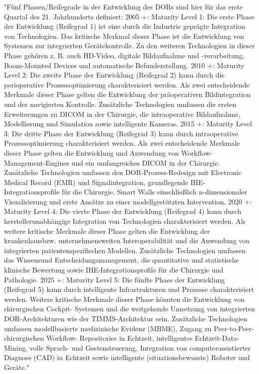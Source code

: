 	"Fünf Phasen/Reifegrade in der Entwicklung des DORs sind hier für das erste Quartal
	des 21. Jahrhunderts definiert:
		2005 +: Maturity Level 1: Die erste Phase der Entwicklung (Reifegrad 1) ist eine
	durch die Industrie geprägte Integration von Technologien. Das kritische Merkmal
	dieser Phase ist die Entwicklung von Systemen zur integrierten Gerätekontrolle. Zu
	den weiteren Technologien in dieser Phase gehören z. B. auch HD-Video, digitale Bildaufnahme
	und -verarbeitung, Boom-Mounted Devices und automatische Befunderstellung.
		2010 +: Maturity Level 2: Die zweite Phase der Entwicklung (Reifegrad 2) kann
	durch die perioperative Prozessoptimierung charakterisiert werden. Als zwei entscheidende
	Merkmale dieser Phase gelten die Entwicklung der präoperativen Bildintegration
	und der navigierten Kontrolle. Zusätzliche Technologien umfassen die
	ersten Erweiterungen zu DICOM in der Chirurgie, die intraoperative Bildaufnahme,
	Modellierung und Simulation sowie intelligente Kameras.
		2015 +: Maturity Level 3: Die dritte Phase der Entwicklung (Reifegrad 3) kann
	durch intraoperative Prozessoptimierung charakterisiert werden. Als zwei entscheidende
	Merkmale dieser Phase gelten die Entwicklung und Anwendung von Workflow-
	Management-Engines und ein umfangreiches DICOM in der Chirurgie. Zusätzliche
	Technologien umfassen den DOR-Prozess-Redesign mit Electronic Medical Record
	(EMR) und Signalintegration, grundlegende IHE-Integrationsprofile für die Chirurgie,
	Smart Walls einschließlich n-dimensionaler Visualisierung und erste Ansätze zu
	einer modellgestützten Intervention.
		2020 +: Maturity Level 4: Die vierte Phase der Entwicklung (Reifegrad 4) kann
	durch herstellerunabhängige Integration von Technologien charakterisiert werden.
	Als weitere kritische Merkmale dieser Phase gelten die Entwicklung der krankenhausbzw.
	unternehmensweiten Interoperabilität und die Anwendung von integrierten
	patientenspezifischen Modellen. Zusätzliche Technologien umfassen das Wissensund
	Entscheidungsmanagement, die quantitative und statistische klinische Bewertung
	sowie IHE-Integrationsprofile für die Chirurgie und Pathologie.
		2025 +: Maturity Level 5: Die fünfte Phase der Entwicklung (Reifegrad 5) kann
	durch intelligente Infrastrukturen und Prozesse charakterisiert werden. Weitere kritische
	Merkmale dieser Phase könnten die Entwicklung von chirurgischen Cockpit-
	Systemen und die weitgehende Umsetzung von integrierten DOR-Architekturen wie
	der TIMMS-Architektur sein. Zusätzliche Technologien umfassen modellbasierte
	medizinische Evidenz (MBME), Zugang zu Peer-to-Peer-chirurgischen Workflow-
	Repositories in Echtzeit, intelligentes Echtzeit-Data-Mining, volle Sprach- und Gestensteuerung,
	Integration von computerassistierter Diagnose (CAD) in Echtzeit sowie
	intelligente (situationsbewusste) Roboter und Geräte."

